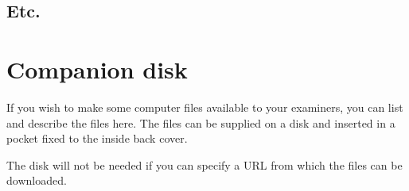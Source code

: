 \documentclass[12pt,openany,a4paper]{book}
\begin{document}
\section{Etc.}

\chapter{Companion disk}

If you wish to make some computer files available to your examiners,
you can list and describe the files here.  The files can be supplied
on a disk and inserted in a pocket fixed to the inside back cover.

The disk will not be needed if you can specify a URL from which the
files can be downloaded.

\cleardoublepage

\newpage
\nocite{*}


\end{document}
